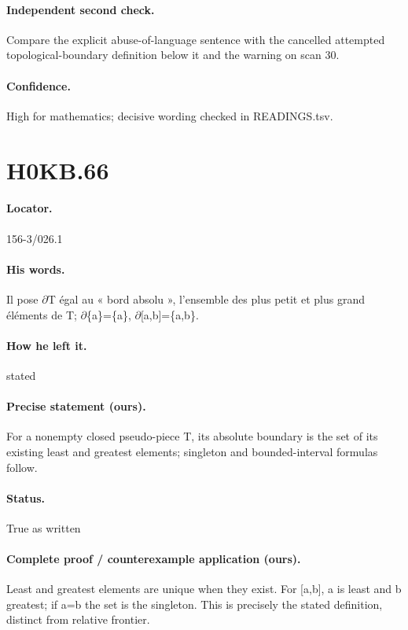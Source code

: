 \paragraph{Independent second check.} Compare the explicit abuse-of-language sentence with the cancelled attempted topological-boundary definition below it and the warning on scan 30.

\paragraph{Confidence.} High for mathematics; decisive wording checked in READINGS.tsv.

\section*{H0KB.66}\label{statement:H0KB.66}
\paragraph{Locator.} 156-3/026.1

\paragraph{His words.} Il pose \ensuremath{\partial}T égal au « bord absolu », l’ensemble des plus petit et plus grand éléments de T; \ensuremath{\partial}\{a\}=\{a\}, \ensuremath{\partial}[a,b]=\{a,b\}.

\paragraph{How he left it.} stated

\paragraph{Precise statement (ours).} For a nonempty closed pseudo-piece T, its absolute boundary is the set of its existing least and greatest elements; singleton and bounded-interval formulas follow.

\paragraph{Status.} True as written

\paragraph{Complete proof / counterexample application (ours).} Least and greatest elements are unique when they exist. For [a,b], a is least and b greatest; if a=b the set is the singleton. This is precisely the stated definition, distinct from relative frontier.

